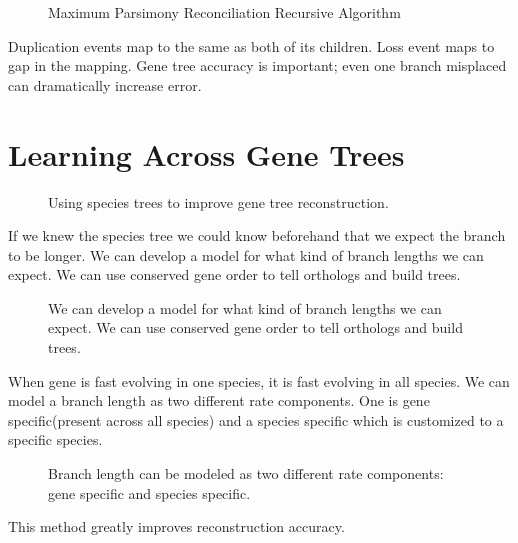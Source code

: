\begin{figure}[ht!]
  \centering
  \caption{Maximum Parsimony Reconciliation Recursive Algorithm} 
  \label{Fig09_MPRAlgorithm}
\end{figure}

Duplication events map to the same as both of its children. Loss event
maps to gap in the mapping. Gene tree accuracy is important; even one
branch misplaced can dramatically increase error.

\section{Learning Across Gene Trees}

\begin{figure}[ht!]
  \centering
  \caption{Using species trees to improve gene tree reconstruction.} 
  \label{Fig10_LearningAcrossGeneTrees}
\end{figure}

If we knew the species tree we could know beforehand that we expect
the branch to be longer. We can develop a model for what kind of
branch lengths we can expect. We can use conserved gene order to tell
orthologs and build trees.

\begin{figure}[ht!]
  \centering
  \caption{We can develop a model for what kind of branch lengths we
    can expect. We can use conserved gene order to tell orthologs and
    build trees.}
  \label{Fig11_DevelopingRatesModel}
\end{figure}

When gene is fast evolving in one species, it is fast evolving in all
species. We can model a branch length as two different rate
components. One is gene specific(present across all species) and a
species specific which is customized to a specific species.

\begin{figure} [ht!] 
  \centering
  \caption{Branch length can be modeled as two different rate
    components: gene specific and species specific.}
  \label{Fig12_UsingRateModels}
\end{figure} 

\noindent This method greatly improves reconstruction accuracy.

